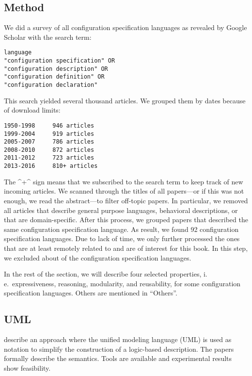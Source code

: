 \subsection{Method}

We did a survey of all configuration specification languages as revealed by Google Scholar with the search term:
\begin{verbatim}
language
"configuration specification" OR
"configuration description" OR
"configuration definition" OR
"configuration declaration"
\end{verbatim}

This search yielded several thousand articles.
We grouped them by dates because of download limits:
\begin{verbatim}
1950-1998     946 articles
1999-2004     919 articles
2005-2007     786 articles
2008-2010     872 articles
2011-2012     723 articles
2013-2016     810+ articles
\end{verbatim}

The ^+^ sign means that we subscribed to the search term to keep track of new incoming articles.
We scanned through the titles of all papers---or if this was not enough, we read the abstract---to filter off-topic papers.
In particular, we removed all articles that describe general purpose languages, behavioral descriptions, or that are domain-specific.
After this process, we grouped papers that described the same configuration specification language.
As result, we found 92 configuration specification languages.
Due to lack of time, we only further processed the ones that are at least remotely related to  and are of interest for this book.
In this step, we excluded about  of the configuration specification languages.

In the rest of the section, we will describe four selected properties, i.\,e.\ expressiveness, reasoning, modularity, and reusability, for some configuration specification languages.
Others are mentioned in ``Others''.

\subsection{UML}

\citet{felfernig1999knowledge,felfernig2000uml,felfernig2002joint} describe an approach where the unified modeling language (UML) is used as notation to simplify the construction of a logic-based description.
The papers formally describe the semantics. Tools are available and experimental results show feasibility.

